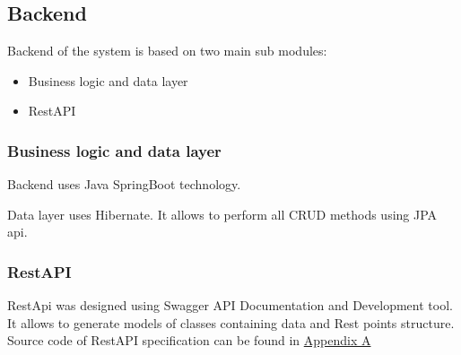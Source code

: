 \subsection{Backend}
Backend of the system is based on two main sub modules: 
\begin{itemize}
    \item Business logic and data layer
    \item RestAPI
\end{itemize}

\subsubsection{Business logic and data layer}
Backend uses Java SpringBoot technology.

Data layer uses Hibernate. It allows to perform all CRUD methods using JPA api.

\subsubsection{RestAPI}
RestApi was designed using Swagger API Documentation and Development tool. It allows to generate models of classes containing data and Rest points structure. Source code of RestAPI specification can be found in \hyperref[sec:appendix_a]{Appendix A}